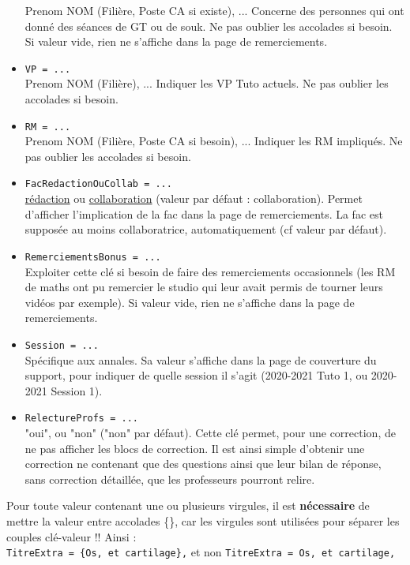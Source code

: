 \documentclass[a4paper,11pt]{article}
\begin{document}
\begin{itemize}
        Prenom NOM (Filière, Poste CA si existe), ... Concerne des personnes qui ont donné des séances de GT ou de souk. Ne pas oublier les accolades si besoin. Si valeur vide, rien ne s'affiche dans la page de remerciements.
    \item \texttt{VP = ...}\\
        Prenom NOM (Filière), ... Indiquer les VP Tuto actuels. Ne pas oublier les accolades si besoin.
    \item \texttt{RM = ...}\\
        Prenom NOM (Filière, Poste CA si besoin), ... Indiquer les RM impliqués. Ne pas oublier les accolades si besoin.
    \item \texttt{FacRedactionOuCollab = ...}\\
        \uline{rédaction} ou \uline{collaboration} (valeur par défaut : collaboration). Permet d'afficher l'implication de la fac dans la page de remerciements. La fac est supposée au moins collaboratrice, automatiquement (cf valeur par défaut).
    \item \texttt{RemerciementsBonus = ...}\\
        Exploiter cette clé si besoin de faire des remerciements occasionnels (les RM de maths ont pu remercier le studio qui leur avait permis de tourner leurs vidéos par exemple). Si valeur vide, rien ne s'affiche dans la page de remerciements.
    \item \texttt{Session = ...}\\
        Spécifique aux annales. Sa valeur s'affiche dans la page de couverture du support, pour indiquer de quelle session il s'agit (2020-2021 Tuto 1, ou 2020-2021 Session 1).
    \item \texttt{RelectureProfs = ...}\\
        "oui", ou "non" ("non" par défaut). Cette clé permet, pour une correction, de ne pas afficher les blocs de correction. Il est ainsi simple d'obtenir une correction ne contenant que des questions ainsi que leur bilan de réponse, sans correction détaillée, que les professeurs pourront relire.
\end{itemize}

\bigskip

 Pour toute valeur contenant une ou plusieurs virgules, il est \textbf{nécessaire} de mettre la valeur entre accolades \{\}, car les virgules sont utilisées pour séparer les couples clé-valeur !! Ainsi :\\

\verb|TitreExtra = {Os, et cartilage},| et non \verb|TitreExtra = Os, et cartilage,|\\
\end{document}
